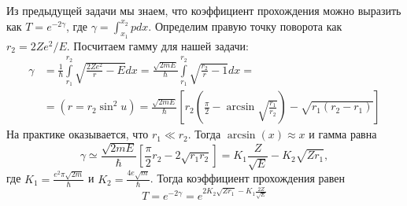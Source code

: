 Из предыдущей задачи мы знаем, что коэффициент прохождения можно выразить как $T = e^{-2\gamma}$, где $\gamma = \int_{x_1}^{x_2}p dx$. Определим правую точку поворота как $r_2 = 2Ze^2/E$. Посчитаем гамму для нашей задачи:
\begin{align*}
    \gamma & = \frac{1}{\hbar}\int\limits_{r_1}^{r_2}\sqrt{\frac{2Ze^2}{r} - E}dx = \frac{\sqrt{2mE}}{\hbar} \int\limits_{r_1}^{r_2} \sqrt{\frac{r_2}{r} - 1}dx = \\
    &= (r = r_2\sin^2 u) = \frac{\sqrt{2mE}}{\hbar}\left[ r_2\left( \frac{\pi}{2} - \arcsin\sqrt{\frac{r_1}{r_2}} \right) - \sqrt{r_1 (r_2 - r_1)}\right]
\end{align*}
На практике оказывается, что $r_1 \ll r_2$. Тогда $\arcsin (x)\approx x$ и гамма равна
\[
\gamma \simeq \frac{\sqrt{2mE}}{\hbar}\left[ \frac{\pi}{2}r_2 - 2\sqrt{r_1 r_2} \right] = K_1\frac{Z}{\sqrt{E}} - K_2\sqrt{Zr_1},
\]
где $K_1 = \frac{e^2\pi\sqrt{2m}}{\hbar}$ и $K_2 = \frac{4e\sqrt{m}}{\hbar}$. Тогда коэффициент прохождения равен
\[
T = e^{-2\gamma} = e^{2K_2\sqrt{Zr_1} - K_1\frac{2Z}{\sqrt{E}}}
\]
